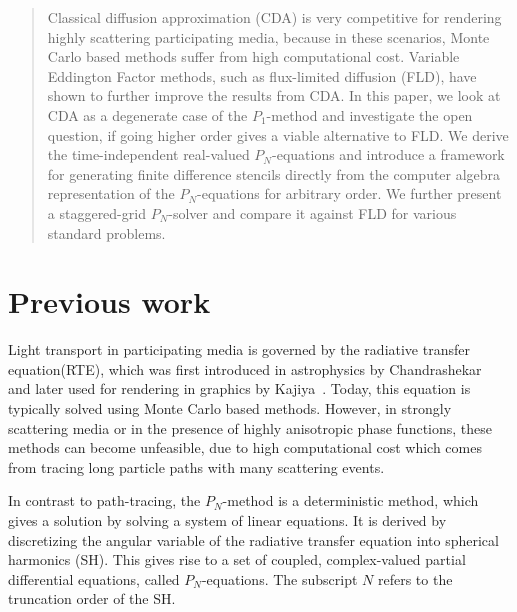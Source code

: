 \begin{abstract}

Classical diffusion approximation (CDA) is very competitive for rendering highly scattering participating media, because in these scenarios, Monte Carlo based methods suffer from high computational cost. Variable Eddington Factor methods, such as flux-limited diffusion (FLD), have shown to further improve the results from CDA. In this paper, we look at CDA as a degenerate case of the $P_1$-method and investigate the open question, if going higher order gives a viable alternative to FLD. We derive the time-independent real-valued $P_N$-equations and introduce a framework for generating finite difference stencils directly from the computer algebra representation of the $P_N$-equations for arbitrary order. We further present a staggered-grid $P_N$-solver and compare it against FLD for various standard problems.



\end{abstract}




\section{Previous work}

Light transport in participating media is governed by the radiative transfer equation(RTE), which was first introduced in astrophysics by Chandrashekar~\cite{Chandrasekhar60} and later used for rendering in graphics by Kajiya~\cite{Kajiya86}. Today, this equation is typically solved using Monte Carlo based methods. However, in strongly scattering media or in the presence of highly anisotropic phase functions, these methods can become unfeasible, due to high computational cost which comes from tracing long particle paths with many scattering events.

In contrast to path-tracing, the $P_N$-method is a deterministic method, which gives a solution by solving a system of linear equations. It is derived by discretizing the angular variable of the radiative transfer equation into spherical harmonics (SH). This gives rise to a set of coupled, complex-valued partial differential equations, called $P_N$-equations. The subscript $N$ refers to the truncation order of the SH. 

